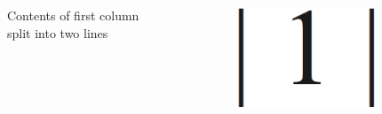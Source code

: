 \documentclass{beamer}
\begin{document}
  \begin{frame}
      \begin{columns}[t] %
      \begin{column}[T]{5cm} %
      Contents of first column \\ split into two lines
      \end{column}
      \begin{column}[T]{5cm} %
	    \includegraphics[height=3cm]{1.eps}
      \end{column}
      \end{columns}
  \end{frame}


\end{document}
